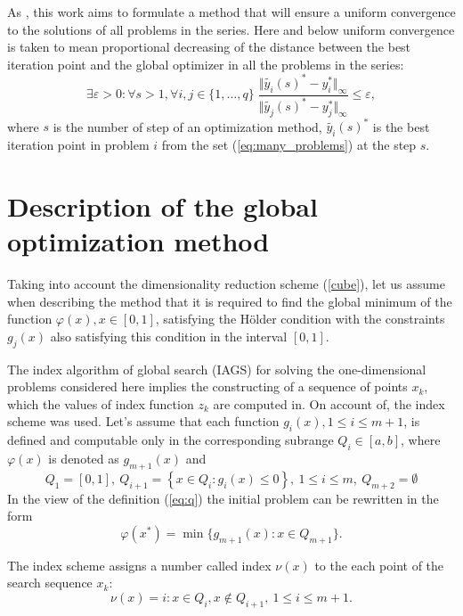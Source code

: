 \documentclass[runningheads]{llncs}
\begin{document}
As \cite{BarkalovStrongin2018}, this work aims to formulate a method that will ensure a uniform convergence to the
solutions of all problems in the series. Here and below uniform convergence is taken to
mean proportional decreasing of the distance between the best iteration point and the
global optimizer in all the problems in the series:
\begin{equation}
  \exists \varepsilon > 0: \forall s>1, \forall i,j\in\{1,\dots,q\}\;
    \frac{\Vert \tilde{y_i}(s)^* - y_i^*\Vert_\infty}{\Vert \tilde{y_j}(s)^* - y^*_j\Vert_	\infty} \leqslant \varepsilon,
\end{equation}
where \(s\) is the number of step of an optimization method, \(\tilde{y_i}(s)^*\) is the best iteration point
in problem \(i\) from the set (\ref{eq:many_problems}) at the step \(s\).

\section{Description of the global optimization method}
\label{sec:method}

Taking into account the dimensionality reduction scheme (\ref{cube}), let us assume when
describing the method that it is required to find the global minimum of the function \(\varphi(x),
x\in[0,1]\), satisfying the H\"{o}lder condition with the constraints \(g_j(x)\) also satisfying this
condition in the interval \([0,1]\).

The index algorithm of global search (IAGS) for solving the one-dimensional problems
considered here implies the constructing of a sequence of points
\(x_k\), which the values of index function \(z_k\) are computed in.
On account of, the index scheme \cite{Strongin2000} was used.
Let's assume that each function \(g_i(x), 1 \leqslant i \leqslant m + 1\), is defined and computable
only in the corresponding subrange \(Q_i \in [a, b]\), where \(\varphi(x)\) is denoted as \(g_{m+1}(x)\) and
\begin{equation}
  \label{eq:q}
  Q_1=[0,1],\: Q_{i+1}=\left\{x\in Q_i:g_{i}(x)\leqslant 0\right\},\:1 \leqslant i \leqslant m, \: Q_{m+2}=\emptyset
\end{equation}
In the view of the definition (\ref{eq:q}) the initial problem can be rewritten in the form
\begin{displaymath}
  \varphi(x^*)=\min\{g_{m+1}(x):x\in Q_{m+1}\}.
\end{displaymath}

The index scheme assigns a number called index \(\nu(x)\) to the each point of the search sequence \(x_k\):
\begin{equation}
  \nu(x) = i:x\in Q_i, x\not\in Q_{i+1},\:1\leqslant i\leqslant m + 1.
\end{equation}
\end{document}
